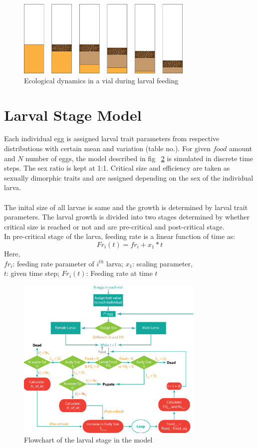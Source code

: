 \begin{figure}[h]
  \centering
  \includegraphics[width=0.75\textwidth]{C2/Figs/vial_diagram}
  \caption{Ecological dynamics in a vial during larval feeding}
  \label{fig:vial}
\end{figure}

\section{Larval Stage Model}
Each individual egg is assigned larval trait parameters from respective distributions with certain mean and variation (table no.). For given $food$ amount and $N$ number of eggs, the model described in fig ~\ref{fig:larval_model} is simulated in discrete time steps. The sex ratio is kept at 1:1. Critical size and efficiency are taken as sexually dimorphic traits and are assigned depending on the sex of the individual larva.\\ \\
The inital size of all larvae is same and the growth is determined by larval trait parameters. The larval growth is divided into two stages determined by whether critical size is reached or not and are pre-critical and post-critical stage. \\
In pre-critical stage of the larva, feeding rate is a linear function of time as:
\[Fr_{i}(t) = fr_{i} + x_{1}*t\]
Here, \\
$fr_{i}$: feeding rate parameter of $i^{th}$ larva; $x_{1}$: scaling parameter, \\
$t$: given time step; $Fr_{i}(t)$: Feeding rate at time $t$
\newline
\begin{figure}[h]
  \centering
  \includegraphics[width=0.8\textwidth]{C2/Figs/larval_model}
  \caption{Flowchart of the larval stage in the model}
  \label{fig:larval_model}
\end{figure}

